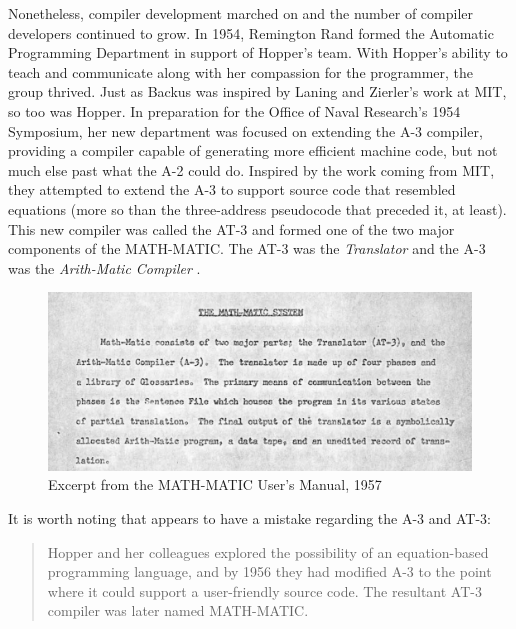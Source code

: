 Nonetheless, compiler development marched on and the number of compiler
developers continued to grow.
In 1954, Remington Rand formed the Automatic Programming Department
in support of Hopper's team.
With Hopper's ability to teach and communicate along with her compassion
for the programmer, the group thrived.
Just as Backus was inspired by Laning and Zierler's work at MIT, so too
was Hopper.
In preparation for the Office of Naval Research's 1954 Symposium,
her new department was focused on extending the A-3 compiler,
providing a compiler capable of generating more efficient machine code,
but not much else past what the A-2 could do.
Inspired by the work coming from MIT, they attempted to extend the A-3 to
support source code that resembled equations (more so than the three-address
pseudocode that preceded it, at least).
This new compiler was called the AT-3 and formed one of the two major
components of the MATH-MATIC. The AT-3 was the \textit{Translator}
and the A-3 was the \textit{Arith-Matic Compiler}
\cite{ash_etal_1957_math-matic_manual}.

\begin{figure}[h]
	\centering
	\includegraphics[width=.7\textwidth]{resource/mathmatic-user-guide.png}
	\caption{Excerpt from the MATH-MATIC User's Manual, 1957}
	\label{fig:mathmatic-user-manual}
\end{figure}

It is worth noting that 
\cite{grace_hopper_and_the_invention_of_the_information_age_2009}
appears to have a mistake regarding the A-3 and AT-3:

\begin{quotation}
	Hopper and her colleagues explored the possibility of an
	equation-based programming language, and by 1956 they had
	modified A-3 to the point where it could support a user-friendly
	source code. The resultant AT-3 compiler was later named
	MATH-MATIC.
\end{quotation}

